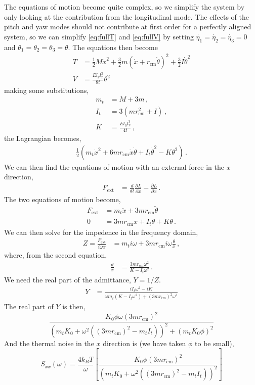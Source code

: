 The equations of motion become quite complex, so we simplify the system by only
looking at the contribution from the longitudinal mode. The effects of the pitch
and yaw modes should not contribute at first order for a perfectly aligned
system, so we can simplify \eqref{eq:fullT} and \eqref{eq:fullV} by setting
$\dot{\eta_1}=\dot{\eta_2}=\dot{\eta_3}=0$ and
$\theta_1=\theta_2=\theta_3=\theta$.
The equations then become
\begin{align}
T &= \frac{1}{2} M\dot{x}^2
    + \frac{3}{2} m\left(\dot{x}+r_{\mathrm{cm}}\dot{\theta} \right)^2
    + \frac{3}{2} I\dot{\theta}^2 \\
V &= \frac{E l_y l_x^3}{8t}\theta^2 
\end{align}
making some substitutions,
\begin{align}
m_t &= M+3m \, , \\
I_t &= 3 \left( mr_{\mathrm{cm}}^2+I \right) \, , \\
K &= \frac{E l_y l_x^3}{4t} \, ,
\end{align}
the Lagrangian becomes,
\begin{align}
\frac{1}{2} \left( m_t \dot{x}^2 +6mr_{\mathrm{cm}}\dot{x}\dot{\theta}
+ I_t\dot{\theta}^2 -K\theta^2 \right) \, .
\end{align}
We can then find the equations of motion with an external force in
the $x$ direction,
\begin{align}
F_{\mathrm{ext}} &= \frac{d}{dt}\frac{\partial L}{\partial \dot{x}}
  - \frac{\partial L}{\partial x} \,.
\end{align}
The two equations of motion become,
\begin{align}
F_{\mathrm{ext}} &= m_t \ddot{x} + 3mr_{\mathrm{cm}}\ddot{\theta} \\
0 &= 3mr_{\mathrm{cm}}\ddot{x} + I_t\ddot{\theta} + K\theta \, .
\end{align}
We can then solve for the impedence in the frequency domain,
\begin{align}
Z = \frac{F_{\mathrm{ext}}}{i\omega x} &= m_t i\omega
  + 3mr_{\mathrm{cm}}i\omega \frac{\theta}{x} \,,
\end{align}
where, from the second equation,
\begin{align}
\frac{\theta}{x} &= \frac{3mr_{\mathrm{cm}}\omega^2}{K-I_t\omega^2} \,.
\end{align}
We need the real part of the admittance, $Y=1/Z$.
\begin{align}
Y &= \frac{iI_t\omega^2-iK}{\omega m_t(K-I_t\omega^2) + (3mr_{\mathrm{cm}})^2\omega^3}
\end{align}
The real part of $Y$ is then,
\begin{equation}
\frac{K_0 \phi \omega (3mr_{\mathrm{cm}})^2}{ \left(
  m_tK_0 + \omega^2 \left( (3mr_{\mathrm{cm}})^2 -m_tI_t \right) \right)^2
  + (m_tK_0 \phi)^2 }
\end{equation}
And the thermal noise in the $x$ direction is (we have taken $\phi$ to be small),
\begin{equation}
S_{xx}(\omega) = \frac{4k_BT}{\omega} \left[
  \frac{K_0\phi (3mr_{\mathrm{cm}})^2}{\left( m_tK_0 + \omega^2 \left( (3mr_{\mathrm{cm}})^2 -m_tI_t \right)
  \right)^2 }
  \right] \label{eq:tnoisesusfull}
\end{equation}

